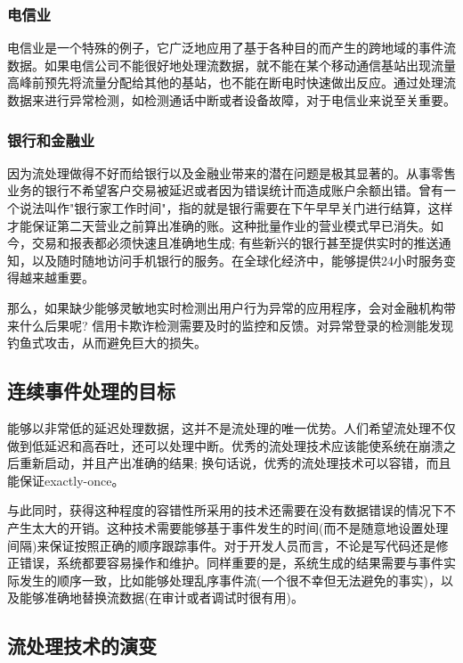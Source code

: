 \documentclass[oneside]{ctexbook}
\begin{document}
\subsubsection{电信业}

电信业是一个特殊的例子，它广泛地应用了基于各种目的而产生的跨地域的事件流数据。如果电信公司不能很好地处理流数据，就不能在某个移动通信基站出现流量高峰前预先将流量分配给其他的基站，也不能在断电时快速做出反应。通过处理流数据来进行异常检测，如检测通话中断或者设备故障，对于电信业来说至关重要。

\subsubsection{银行和金融业}

因为流处理做得不好而给银行以及金融业带来的潜在问题是极其显著的。从事零售业务的银行不希望客户交易被延迟或者因为错误统计而造成账户余额出错。曾有一个说法叫作"银行家工作时间"，指的就是银行需要在下午早早关门进行结算，这样才能保证第二天营业之前算出准确的账。这种批量作业的营业模式早已消失。如今，交易和报表都必须快速且准确地生成; 有些新兴的银行甚至提供实时的推送通知，以及随时随地访问手机银行的服务。在全球化经济中，能够提供24小时服务变得越来越重要。

那么，如果缺少能够灵敏地实时检测出用户行为异常的应用程序，会对金融机构带来什么后果呢? 信用卡欺诈检测需要及时的监控和反馈。对异常登录的检测能发现钓鱼式攻击，从而避免巨大的损失。

\subsection{连续事件处理的目标}

能够以非常低的延迟处理数据，这并不是流处理的唯一优势。人们希望流处理不仅做到低延迟和高吞吐，还可以处理中断。优秀的流处理技术应该能使系统在崩溃之后重新启动，并且产出准确的结果; 换句话说，优秀的流处理技术可以容错，而且能保证exactly-once。

与此同时，获得这种程度的容错性所采用的技术还需要在没有数据错误的情况下不产生太大的开销。这种技术需要能够基于事件发生的时间(而不是随意地设置处理间隔)来保证按照正确的顺序跟踪事件。对于开发人员而言，不论是写代码还是修正错误，系统都要容易操作和维护。同样重要的是，系统生成的结果需要与事件实际发生的顺序一致，比如能够处理乱序事件流(一个很不幸但无法避免的事实)，以及能够准确地替换流数据(在审计或者调试时很有用)。

\subsection{流处理技术的演变}
\end{document}
